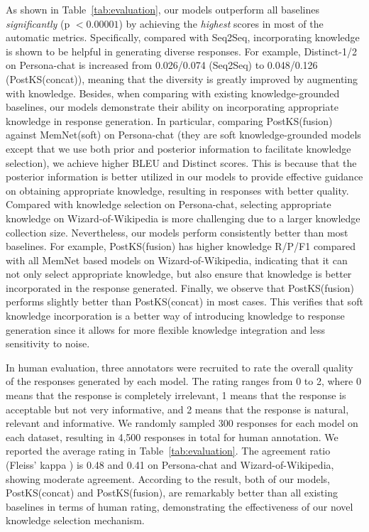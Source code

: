 \documentclass{article}
\begin{document}
As shown in Table~\ref{tab:evaluation},
our models outperform all baselines \emph{significantly} (p $<0.00001$)
by achieving the \emph{highest} scores in most of the automatic metrics. 
Specifically,
compared with Seq2Seq,
incorporating knowledge is shown to be helpful in generating diverse responses.
For example, Distinct-1/2 on Persona-chat is increased
from 0.026/0.074 (Seq2Seq) to 0.048/0.126 (PostKS(concat)),
meaning that the diversity is greatly improved by augmenting with knowledge.
%
Besides, when comparing with existing knowledge-grounded baselines,
our models demonstrate their ability on incorporating appropriate knowledge in response generation.
In particular, comparing PostKS(fusion) against MemNet(soft) on Persona-chat 
(they are soft knowledge-grounded models except that we use both prior and posterior information to facilitate knowledge selection),
we achieve higher BLEU and Distinct scores. 
This is because that the posterior information is better utilized in our models to provide effective guidance on obtaining appropriate knowledge,
resulting in responses with better quality. 
%
Compared with knowledge selection on Persona-chat,
selecting appropriate knowledge on Wizard-of-Wikipedia is more challenging  
due to a larger knowledge collection size.
Nevertheless,
our models perform consistently better than most baselines.
For example, PostKS(fusion) has higher knowledge R/P/F1 compared with all MemNet based models on Wizard-of-Wikipedia,
indicating that it can not only select appropriate knowledge, 
but also ensure that knowledge is better incorporated in the response generated.
%
Finally,
we observe that PostKS(fusion) performs slightly better than PostKS(concat) in most cases.
This verifies that soft knowledge incorporation is a better way of introducing knowledge to response generation 
since it allows for more flexible knowledge integration and less sensitivity to noise.

In human evaluation,
three annotators were recruited to rate the overall quality of the responses generated by each model. 
The rating ranges from 0 to 2,
where 0 means that the response is completely irrelevant,
1 means that the response is acceptable but not very informative, and
2 means that the response is natural, relevant and informative.
We randomly sampled 300 responses for each model on each dataset,
resulting in 4,500 responses in total for human annotation.
We reported the average rating in Table~\ref{tab:evaluation}. 
The agreement ratio (Fleiss' kappa \cite{fleiss1971measuring})
is 0.48 and 0.41 on Persona-chat and Wizard-of-Wikipedia,
showing moderate agreement.
According to the result, 
both of our models, PostKS(concat) and PostKS(fusion), are remarkably better than all existing baselines in terms of human rating,
demonstrating the effectiveness of our novel knowledge selection mechanism. 
\end{document}
